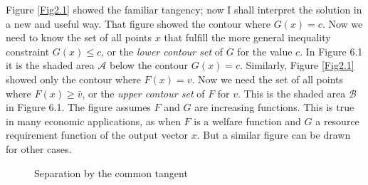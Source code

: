 Figure \ref{Fig2.1} showed the familiar tangency; now I shall interpret the solution in a new and useful way. That figure showed the contour where $G(x)=c$. Now we need to know the set of all points $x$ that fulfill the more general inequality constraint $G(x) \leq c$, or the \textit{lower contour set} of $G$ for the value $c$. In Figure 6.1 it is the shaded area $\mathcal{A}$ below the contour $G(x)=c$. Similarly, Figure \ref{Fig2.1} showed only the contour where $F(x)=v$. Now we need the set of all points where $F(x) \geq \bar{v}$, or the \textit{upper contour set} of $F$ for $v$. This is the shaded area $\mathcal{B}$ in Figure 6.1. The figure assumes $F$ and $G$ are increasing functions. This is true in many economic applications, as when $F$ is a welfare function and $G$ a resource requirement function of the output vector $x$. But a similar figure can be drawn for other cases.
\begin{figure}[!htb] %
\centering %
\caption{Separation by the common tangent} %
\label{Fig6.1} %
\end{figure}

